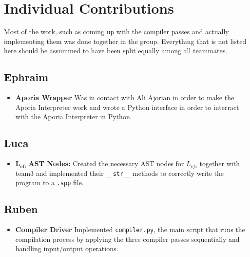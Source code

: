 \newpage
\section{Individual Contributions}
Most of the work, such as coming up with the compiler passes and actually implementing them was done together in the group. Everything that is not listed here should be assummed
to have been split equally among all teammates.
\subsection{Ephraim}

\begin{itemize}
	\item \textbf{Aporia Wrapper} Was in contact with Ali Ajorian in order to make the Aporia Interpreter work and wrote a Python interface in order to interract with the Aporia Interpreter in Python.
\end{itemize}

\subsection{Luca}

\begin{itemize}
	\item $\mathbf{L_{cfi}}$\textbf{ AST Nodes:} Created the necessary AST nodes for $L_{cfi}$ together with team3 and implemented their \texttt{\_\_str\_\_} methods to correctly write the program to a \texttt{.spp} file.
\end{itemize}

\subsection{Ruben}

\begin{itemize}
    \item \textbf{Compiler Driver} Implemented \texttt{compiler.py}, the main script that runs the compilation process by applying the three compiler passes sequentially and handling input/output operations.
\end{itemize}

